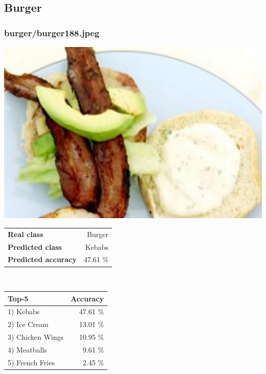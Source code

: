 \subsection{Burger}
    
\subsubsection{burger/burger188.jpeg}

\begin{minipage}[t]{0.4\textwidth}
	\vspace{0pt}
	\includegraphics[width=\linewidth]{images/evaluation-images/burger/burger188.jpeg}
\end{minipage}
\hfill
\begin{minipage}[t]{0.5\textwidth}
	\vspace{0pt}\raggedright
	\begin{tabularx}{\textwidth}{X r}
		\small \textbf{Real class} & \small Burger\\
		\small \textbf{Predicted class} & \small Kebabs\\
		\small \textbf{Predicted accuracy} & \small 47.61 \%
    \end{tabularx}\\
    
    \vspace{6pt}
	\begin{tabularx}{\textwidth}{X r}
        \small \textbf{Top-5} & \small \textbf{Accuracy} \\
        \hline
		\small 1) Kebabs & \small 47.61 \%\\\small 2) Ice Cream & \small 13.01 \%\\\small 3) Chicken Wings & \small 10.95 \%\\\small 4) Meatballs & \small 9.61 \%\\\small 5) French Fries & \small 2.45 \%
    \end{tabularx}
\end{minipage}
    
